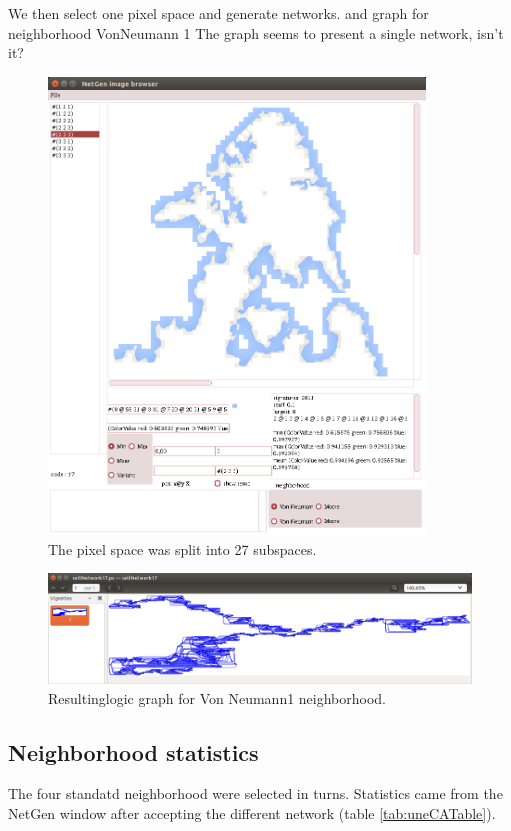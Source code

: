 We then select one pixel space and generate networks. and graph for neighborhood VonNeumann 1
The graph seems to present a single network, isn't it?
\begin{figure}[hbtp]
\begin{center} 
\includegraphics[width=10cm]{diego-class17-3.png}
\caption{The pixel space was split into 27 subspaces.}
\end{center}
\end{figure}


\begin{figure}[hbtp]
\begin{center} 
\includegraphics[width=12cm]{diegoGraph17.png}
\caption{Resultinglogic  graph for Von Neumann1 neighborhood.}
\end{center}
\end{figure}

\subsection{ Neighborhood statistics}

The four standatd neighborhood were selected in turns. Statistics came from the NetGen window
after accepting the different network (table \ref{tab:uneCATable}).



